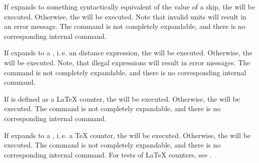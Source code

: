 \begin{Declaration}
\end{Declaration}
If
 expands to something syntactically equivalent of the value
of a skip, the  will be executed. Otherwise, the  will be executed.  Note that invalid units will
result in an error message.  The command is not completely expandable, and
there is no corresponding internal command.%
\EndIndexGroup


\begin{Declaration}
\end{Declaration}
If
 expands to a , i.\,e. an \eTeX{} distance
expression, the  will be executed. Otherwise, the  will be executed.  Note, that illegal expressions
will result in error messages. The command is not completely expandable, and
there is no corresponding internal command.%
\EndIndexGroup


\begin{Declaration}
\end{Declaration}
If
 is defined as a \LaTeX{} counter, the  will
be executed. Otherwise, the  will be executed. The command is
not completely expandable, and there is no corresponding internal command.%
\EndIndexGroup


\begin{Declaration}
\end{Declaration}
If
 expands to a , i.\,e. a \TeX{} counter, the
 will be executed. Otherwise, the  will be
executed. The command is not completely expandable, and there is no
corresponding internal command. For tests of \LaTeX{} counters, see
.%
\EndIndexGroup


